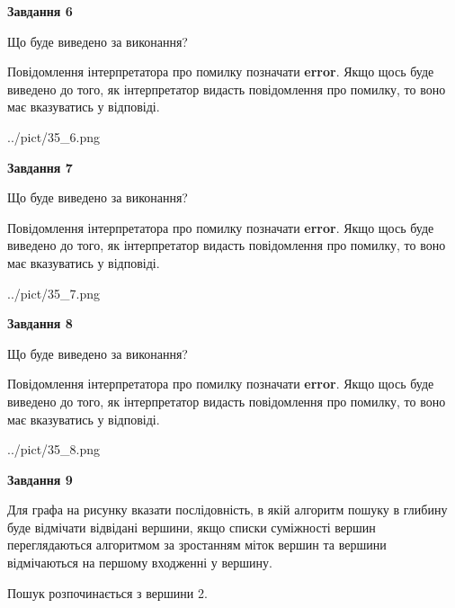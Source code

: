 \documentclass[12pt, ukrainian]{article}
\begin{document}
{\begin {large}
{\begin {center}\textbf{Завдання 6}\end {center}}\par
Що буде виведено за виконання?

Повідомлення інтерпретатора про помилку позначати \textbf{error}.
Якщо щось буде виведено до того, як інтерпретатор видасть повідомлення про помилку, 
то воно має вказуватись у відповіді. \par


\begin{center}
	{../pict/35_6.png}
\end{center}
\newpage

{\begin {center}\textbf{Завдання 7}\end {center}}\par
Що буде виведено за виконання?

Повідомлення інтерпретатора про помилку позначати \textbf{error}.
Якщо щось буде виведено до того, як інтерпретатор видасть повідомлення про помилку, 
то воно має вказуватись у відповіді. \par


\begin{center}
	{../pict/35_7.png}
\end{center}
\newpage

{\begin {center}\textbf{Завдання 8}\end {center}}\par
Що буде виведено за виконання?

Повідомлення інтерпретатора про помилку позначати \textbf{error}.
Якщо щось буде виведено до того, як інтерпретатор видасть повідомлення про помилку, 
то воно має вказуватись у відповіді. \par


\begin{center}
	{../pict/35_8.png}
\end{center}
\newpage

{\begin {center}\textbf{Завдання 9}\end {center}}\par
Для графа на рисунку вказати послідовність, в якій алгоритм пошуку в глибину буде відмічати відвідані вершини, якщо списки суміжності вершин переглядаються алгоритмом за зростанням міток вершин та вершини відмічаються на першому вход\-женні у вершину.\par
Пошук розпочинається з вершини 2.\par


\end{large}}
\end{document}
